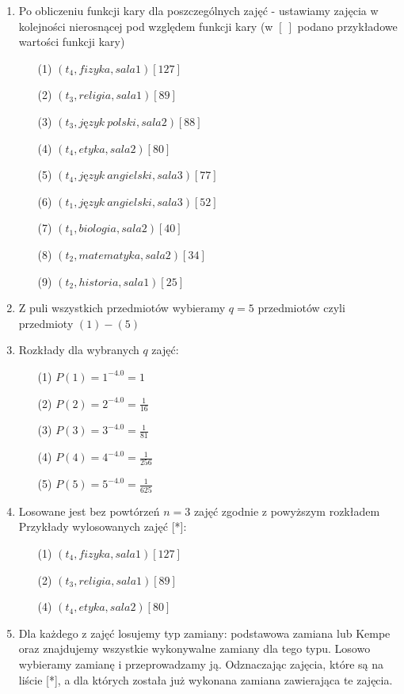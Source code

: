 \begin{enumerate}
\item Po obliczeniu funkcji kary dla poszczególnych zajęć - ustawiamy zajęcia w kolejności nierosnącej pod względem funkcji kary (w $[\ ]$ podano przykładowe wartości funkcji kary)\\
\begin{enumerate}
 \item[(1)] $(t_{4}, fizyka, sala1)[127]$
 \item[(2)] $(t_{3}, religia, sala1)[89]$
 \item[(3)] $(t_{3}, język\ polski, sala2)[88]$
 \item[(4)] $(t_{4}, etyka, sala2)[80]$
 \item[(5)] $(t_{4}, język\ angielski, sala3)[77]$
 \item[(6)] $(t_{1}, język\ angielski, sala3)[52]$
 \item[(7)] $(t_{1}, biologia, sala2)[40]$
 \item[(8)] $(t_{2}, matematyka, sala2)[34]$
 \item[(9)] $(t_{2}, historia, sala1)[25]$
\end{enumerate}
\item Z puli wszystkich przedmiotów wybieramy $q = 5$ przedmiotów czyli przedmioty $(1) - (5)$ 
\item Rozkłady dla wybranych $q$ zajęć:
	\begin{enumerate}
	\item[(1)] $P(1) = 1^{-4.0} = 1$
 	\item[(2)] $P(2) = 2^{-4.0} = \frac{1}{16}$
 	\item[(3)] $P(3) = 3^{-4.0} = \frac{1}{81}$
 	\item[(4)] $P(4) = 4^{-4.0} = \frac{1}{256}$
 	\item[(5)] $P(5) = 5^{-4.0} = \frac{1}{625}$
	\end{enumerate}
\item Losowane jest bez powtórzeń $n = 3$ zajęć zgodnie z powyższym rozkładem \\
	Przykłady wylosowanych zajęć [*]:
	\begin{enumerate}
	 \item[(1)] $(t_{4}, fizyka, sala1)[127]$
	 \item[(2)] $(t_{3}, religia, sala1)[89]$
	  \item[(4)] $(t_{4}, etyka, sala2)[80]$
	\end{enumerate}
\item Dla każdego z zajęć losujemy typ zamiany: podstawowa zamiana lub Kempe oraz znajdujemy wszystkie wykonywalne zamiany dla tego typu. Losowo wybieramy zamianę i przeprowadzamy ją. Odznaczając zajęcia, które są na liście [*], a dla których została już wykonana zamiana zawierająca te zajęcia.
\end{enumerate}

